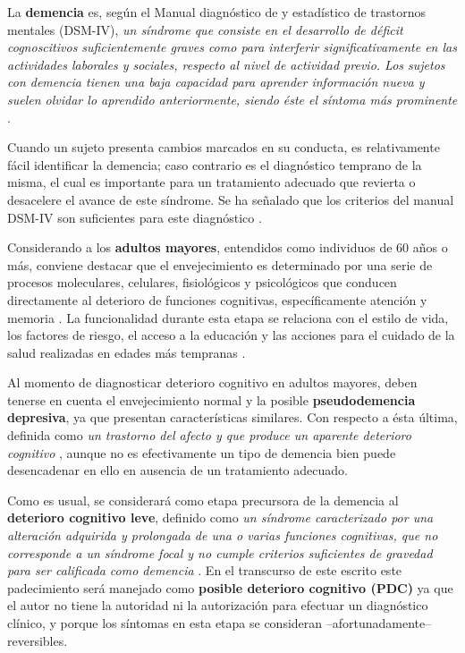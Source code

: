 La \textbf{demencia} es, según el Manual diagnóstico de y estadístico de trastornos mentales 
(DSM-IV), \textit{un síndrome que consiste en el desarrollo de déficit cognoscitivos 
suficientemente graves como para interferir significativamente en las actividades laborales y 
sociales, respecto al nivel de actividad previo. 
Los sujetos con demencia tienen una baja capacidad para aprender información nueva y suelen olvidar 
lo aprendido anteriormente, siendo éste el síntoma más prominente} \cite{DCM5}.

Cuando un sujeto presenta cambios marcados en su conducta, es relativamente fácil identificar la 
demencia; caso contrario es el diagnóstico temprano de la misma, el cual es importante para un 
tratamiento adecuado que revierta o desacelere el avance de este síndrome.
Se ha señalado que los criterios del manual DSM-IV son suficientes para este diagnóstico
\cite{Knopman01}.

Considerando a los \textbf{adultos mayores}, entendidos como individuos de 60 años o más, conviene 
destacar que el envejecimiento es determinado por una serie de procesos moleculares, celulares, 
fisiológicos y psicológicos que conducen directamente al deterioro de funciones cognitivas, 
específicamente atención y memoria \cite{Navarrete03,Park09}.
La funcionalidad durante esta etapa se relaciona con el estilo de vida, los factores de riesgo, el 
acceso a la educación y las acciones para el cuidado de la salud realizadas en edades más 
tempranas \cite{Ohayon04,Sanhueza14}.

Al momento de diagnosticar deterioro cognitivo en adultos mayores, deben tenerse en cuenta el 
envejecimiento normal y la posible \textbf{pseudodemencia depresiva}, ya que presentan 
características similares. Con respecto a ésta última, definida como \textit{un trastorno del 
afecto y que produce un aparente deterioro cognitivo} \cite{DCM5}, aunque no es efectivamente un 
tipo de demencia bien puede desencadenar en ello en ausencia de un tratamiento adecuado.

Como es usual, se considerará como etapa precursora de la demencia al \textbf{deterioro cognitivo 
leve}, definido como \textit{un síndrome caracterizado por una alteración adquirida y prolongada de 
una o varias funciones cognitivas, que no corresponde a un síndrome focal y no cumple criterios 
suficientes de gravedad para ser calificada como demencia} \cite{Robles02}.
En el transcurso de este escrito este padecimiento será manejado como \textbf{posible deterioro 
cognitivo (PDC)} ya que el autor no tiene la autoridad ni la autorización para efectuar un 
diagnóstico clínico, y porque los síntomas en esta etapa se consideran --afortunadamente-- 
reversibles.

